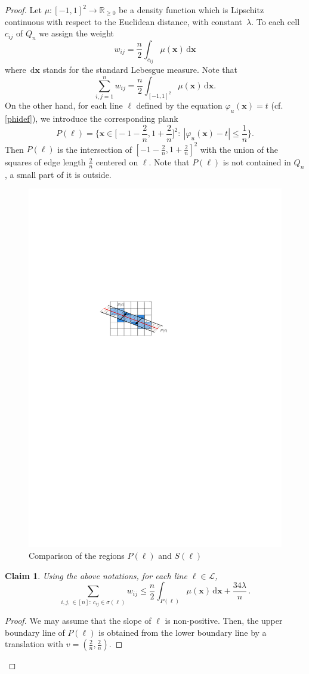 \documentclass[11pt,a4paper]{amsart}
\newtheorem{claim}[theorem]{Claim}
\newcommand{\R}{\mathbb{R}}
\newcommand{\dd}{\,\mathrm{d}}
\newcommand{\Lc}{\mathcal{L}}
\newcommand{\x}{\mathbf{x}}
\begin{document}
\begin{proof}
Let $\mu: [-1,1]^2 \rightarrow \R_{\geq 0}$ be a density function which is Lipschitz continuous with respect to the Euclidean distance, with constant~$\lambda$.
To each cell $c_{ij}$ of $Q_n$ we assign the weight
\begin{equation}\label{wij}
w_{ij} = \frac n 2 \int_{c_{ij}}\mu(\x) \dd \x
\end{equation}
where $\dd \x$ stands for the standard Lebesgue measure.
Note that
\begin{equation}\label{sumwij}
\sum_{i,j=1}^n w_{ij} = \frac n 2 \int_{[-1,1]^2} \mu(\x) \dd \x.
\end{equation}
On the other hand, for each line $\ell$ defined by the equation $\varphi_u(\x) = t$ (cf. \eqref{phidef}), we introduce the corresponding plank
\begin{equation}
P(\ell) = \Big\{ \x \in \Big[-1 - \frac 2 n, 1 + \frac 2 n \Big]^2:\ |\varphi_u(\x) - t| \leq \frac 1 n \Big\}.
\end{equation}
Then $P(\ell)$ is the intersection of $[-1 - \frac 2 n,1+ \frac 2 n]^2$ with the union of the squares of edge length $\frac 2 n$ centered on $\ell$.
Note that $P(\ell)$ is not contained in $Q_n$, a small part of it is outside.


\begin{figure}[h]
  \centering
  \includegraphics[width = 0.5 \textwidth]{Figures/chess2.pdf}
  \caption{Comparison of the regions $P(\ell)$ and $S(\ell)$}
\label{fig3}
\end{figure}


\begin{claim}
Using the above notations, for each line $\ell \in \Lc$,
\[
\sum_{i,j, \in [n]: \ c_{ij} \in \sigma(\ell)} w_{ij} \leq \frac n 2 \int_{P(\ell)} \mu(\x)  \dd \x +  \frac {34 \lambda} {n} \,.
\]
\end{claim}
\begin{proof}
We may assume that the slope of $\ell$ is non-positive. Then, the upper boundary line of $P(\ell)$ is obtained from the lower boundary line by a translation with $v =(\frac 2 n, \frac 2 n)$.


\end{proof}
\end{proof}
\end{document}
